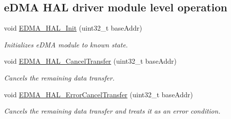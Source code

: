 \subsection*{e\+D\+MA H\+AL driver module level operation}
\begin{DoxyCompactItemize}
\item 
void \hyperlink{group__edma__hal_ga525f4cf91f14f7ce6451ebb9e8c95c8c}{E\+D\+M\+A\+\_\+\+H\+A\+L\+\_\+\+Init} (uint32\+\_\+t base\+Addr)
\begin{DoxyCompactList}\small\item\em Initializes e\+D\+MA module to known state. \end{DoxyCompactList}\item 
void \hyperlink{group__edma__hal_ga3be8bbd6ea7977e32cdf4c7348391ebf}{E\+D\+M\+A\+\_\+\+H\+A\+L\+\_\+\+Cancel\+Transfer} (uint32\+\_\+t base\+Addr)
\begin{DoxyCompactList}\small\item\em Cancels the remaining data transfer. \end{DoxyCompactList}\item 
void \hyperlink{group__edma__hal_gaeefd145855bdf4381bc03efd088801c4}{E\+D\+M\+A\+\_\+\+H\+A\+L\+\_\+\+Error\+Cancel\+Transfer} (uint32\+\_\+t base\+Addr)
\begin{DoxyCompactList}\small\item\em Cancels the remaining data transfer and treats it as an error condition. \end{DoxyCompactList}\end{DoxyCompactItemize}
